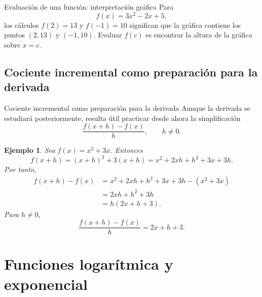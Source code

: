 \documentclass[aspectratio=169,10pt]{beamer}
\newtheorem{ejemplo}{Ejemplo}
\begin{document}
\begin{frame}{Evaluación de una función: interpretación gráfica}
Para
\[
f(x)=3x^2-2x+5,
\]
los cálculos $f(2)=13$ y $f(-1)=10$ significan que la gráfica contiene los
puntos $(2,13)$ y $(-1,10)$. Evaluar $f(c)$ es encontrar la altura de la
gráfica sobre $x=c$.
\begin{center}
\end{center}
\end{frame}

\subsection*{Cociente incremental como preparación para la derivada}
\begin{frame}{Cociente incremental como preparación para la derivada}
Aunque la derivada se estudiará posteriormente, resulta útil practicar desde
ahora la simplificación
\[
\frac{f(x+h)-f(x)}{h},\qquad h\neq0.
\]

\begin{ejemplo}
Sea $f(x)=x^2+3x$. Entonces
\[
f(x+h)=(x+h)^2+3(x+h)
=x^2+2xh+h^2+3x+3h.
\]
Por tanto,
\begin{align*}
f(x+h)-f(x)
&=x^2+2xh+h^2+3x+3h-(x^2+3x)\\
&=2xh+h^2+3h\\
&=h(2x+h+3).
\end{align*}
Para $h\neq0$,
\[
\frac{f(x+h)-f(x)}{h}=2x+h+3.
\]
\end{ejemplo}

\end{frame}

\section{Funciones logarítmica y exponencial}
\end{document}
